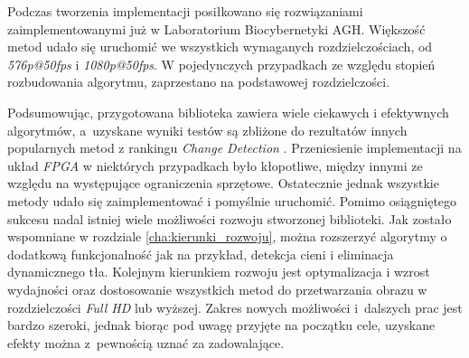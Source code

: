Podczas tworzenia implementacji posiłkowano się rozwiązaniami zaimplementowanymi już w Laboratorium Biocybernetyki AGH. 
Większość metod udało się uruchomić we wszystkich wymaganych rozdzielczościach, od \textit{576p@50fps} i \textit{1080p@50fps}. 
W pojedynczych przypadkach ze względu stopień rozbudowania algorytmu, zaprzestano na podstawowej rozdzielczości.

Podsumowując, przygotowana biblioteka zawiera wiele ciekawych i efektywnych algorytmów, a~uzyskane wyniki testów są zbliżone do rezultatów innych popularnych metod z rankingu \textit{Change Detection} \cite{change_detection_web}. Przeniesienie implementacji na układ \textit{FPGA} w niektórych przypadkach było kłopotliwe, między innymi ze względu na występujące ograniczenia sprzętowe. Ostatecznie jednak wszystkie metody udało się zaimplementować i pomyślnie uruchomić. Pomimo osiągniętego sukcesu nadal istniej wiele możliwości rozwoju stworzonej biblioteki. Jak zostało wspomniane w rozdziale \ref{cha:kierunki_rozwoju}, można rozszerzyć algorytmy o dodatkową funkcjonalność jak na przykład, detekcja cieni i eliminacja dynamicznego tła. Kolejnym kierunkiem rozwoju jest optymalizacja i wzrost wydajności oraz dostosowanie wszystkich metod do przetwarzania obrazu w rozdzielczości \textit{Full HD} lub wyższej. Zakres nowych możliwości i~dalszych prac jest bardzo szeroki, jednak biorąc pod uwagę przyjęte na początku cele, uzyskane efekty można z~pewnością uznać za zadowalające. 